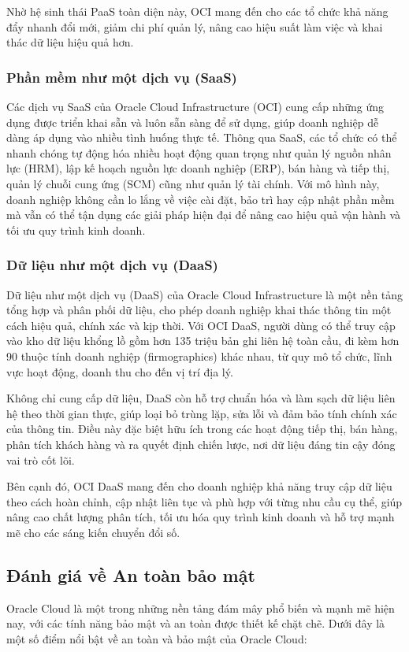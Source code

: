 Nhờ hệ sinh thái PaaS toàn diện này, OCI mang đến cho các tổ chức khả năng đẩy nhanh đổi mới, giảm chi phí quản lý, nâng cao hiệu suất làm việc và khai thác dữ liệu hiệu quả hơn.

\subsubsection{Phần mềm như một dịch vụ (SaaS)}
Các dịch vụ SaaS của Oracle Cloud Infrastructure (OCI) cung cấp những ứng dụng được triển khai sẵn và luôn sẵn sàng để sử dụng, giúp doanh nghiệp dễ dàng áp dụng vào nhiều tình huống thực tế. Thông qua SaaS, các tổ chức có thể nhanh chóng tự động hóa nhiều hoạt động quan trọng như quản lý nguồn nhân lực (HRM), lập kế hoạch nguồn lực doanh nghiệp (ERP), bán hàng và tiếp thị, quản lý chuỗi cung ứng (SCM) cũng như quản lý tài chính. Với mô hình này, doanh nghiệp không cần lo lắng về việc cài đặt, bảo trì hay cập nhật phần mềm mà vẫn có thể tận dụng các giải pháp hiện đại để nâng cao hiệu quả vận hành và tối ưu quy trình kinh doanh.

\subsubsection{Dữ liệu như một dịch vụ (DaaS)}
Dữ liệu như một dịch vụ (DaaS) của Oracle Cloud Infrastructure là một nền tảng tổng hợp và phân phối dữ liệu, cho phép doanh nghiệp khai thác thông tin một cách hiệu quả, chính xác và kịp thời. Với OCI DaaS, người dùng có thể truy cập vào kho dữ liệu khổng lồ gồm hơn 135 triệu bản ghi liên hệ toàn cầu, đi kèm hơn 90 thuộc tính doanh nghiệp (firmographics) khác nhau, từ quy mô tổ chức, lĩnh vực hoạt động, doanh thu cho đến vị trí địa lý.

Không chỉ cung cấp dữ liệu, DaaS còn hỗ trợ chuẩn hóa và làm sạch dữ liệu liên hệ theo thời gian thực, giúp loại bỏ trùng lặp, sửa lỗi và đảm bảo tính chính xác của thông tin. Điều này đặc biệt hữu ích trong các hoạt động tiếp thị, bán hàng, phân tích khách hàng và ra quyết định chiến lược, nơi dữ liệu đáng tin cậy đóng vai trò cốt lõi.

Bên cạnh đó, OCI DaaS mang đến cho doanh nghiệp khả năng truy cập dữ liệu theo cách hoàn chỉnh, cập nhật liên tục và phù hợp với từng nhu cầu cụ thể, giúp nâng cao chất lượng phân tích, tối ưu hóa quy trình kinh doanh và hỗ trợ mạnh mẽ cho các sáng kiến chuyển đổi số.

\subsection{Đánh giá về An toàn bảo mật}
Oracle Cloud là một trong những nền tảng đám mây phổ biến và mạnh mẽ hiện nay, với các tính năng bảo mật và an toàn được thiết kế chặt chẽ. Dưới đây là một số điểm nổi bật về an toàn và bảo mật của Oracle Cloud:

